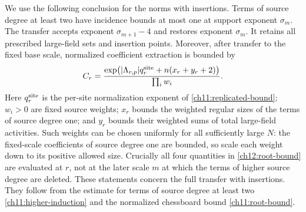 We use the following conclusion for the norms with insertions. Terms of source degree at least two have incidence
bounds at most one at support exponent $\sigma_m$. The transfer
accepts exponent $\sigma_{m+1}-4$ and restores exponent $\sigma_m$.
It retains all prescribed large-field sets and insertion points. Moreover, after transfer
to the fixed base scale, normalized coefficient extraction is bounded
by
\begin{equation}
 C_r=\frac{\exp\bigl(|\Lambda_{r,p}|q_r^{\rm site}+n(x_r+y_r+2)\bigr)}
                 {\prod_i w_i}.
 \label{ch12:root-bound}
\end{equation}
Here $q_r^{\rm site}$ is the per-site normalization exponent of \eqref{ch11:replicated-bound}; $w_i>0$ are fixed source weights; $x_r$ bounds the weighted regular sizes of the terms of source degree one; and $y_r$
bounds their weighted sums of total large-field activities. Such weights can be
chosen uniformly for all sufficiently large $N$: the fixed-scale coefficients of source degree one are bounded, so scale each weight down to its positive
allowed size. Crucially all four quantities in \eqref{ch12:root-bound}
are evaluated at $r$, not at the later scale $m$ at which the terms of higher source degree are deleted.
These statements concern the full transfer with insertions.
They follow from the estimate for terms of source degree at least two
\eqref{ch11:higher-induction} and the normalized chessboard bound
\eqref{ch11:root-bound}.

